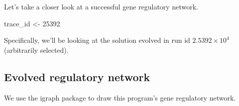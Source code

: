 \documentclass[]{book}
\newenvironment{Shaded}{\begin{snugshade}}{\end{snugshade}}
\newcommand{\DecValTok}[1]{\textcolor[rgb]{0.00,0.00,0.81}{#1}}
\newcommand{\NormalTok}[1]{#1}
\newcommand{\StringTok}[1]{\textcolor[rgb]{0.31,0.60,0.02}{#1}}
\begin{document}
Let's take a closer look at a successful gene regulatory network.

\begin{Shaded}
\begin{Highlighting}[]
\NormalTok{trace_id <-}\StringTok{ }\DecValTok{25392}
\end{Highlighting}
\end{Shaded}

Specifically, we'll be looking at the solution evolved in run id \ensuremath{2.5392\times 10^{4}} (arbitrarily selected).

\hypertarget{evolved-regulatory-network-3}{%
\subsection{Evolved regulatory network}\label{evolved-regulatory-network-3}}

We use the igraph package to draw this program's gene regulatory network.
\end{document}
